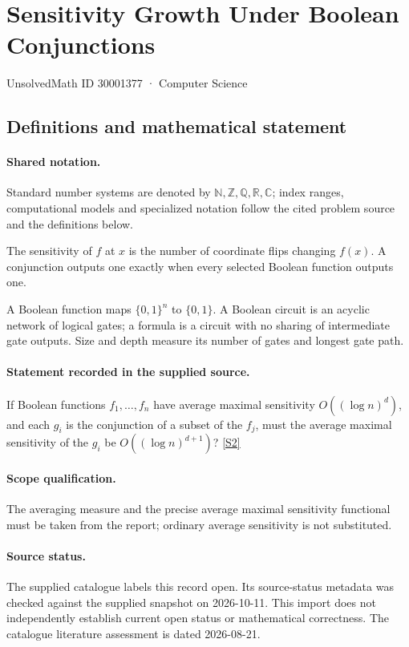 \documentclass[11pt]{article}
\newcommand{\sref}[2]{\hyperlink{source:#1:#2}{[S#2]}}
\begin{document}
\setcounter{section}{30001376}
\section{Sensitivity Growth Under Boolean Conjunctions}\label{30001377}
{\small\sffamily UnsolvedMath ID 30001377 · Computer Science}
\subsection{Definitions and mathematical statement}

\paragraph{Shared notation.}Standard number systems are denoted by $\mathbb N,\mathbb Z,\mathbb Q,\mathbb R,\mathbb C$; index ranges, computational models and specialized notation follow the cited problem source and the definitions below.


The sensitivity of $f$ at $x$ is the number of coordinate flips changing $f(x)$. A conjunction outputs one exactly when every selected Boolean function outputs one.

A Boolean function maps $\{0,1\}^n$ to $\{0,1\}$. A Boolean circuit is an acyclic network of logical gates; a formula is a circuit with no sharing of intermediate gate outputs. Size and depth measure its number of gates and longest gate path.
\paragraph{Statement recorded in the supplied source.}
If Boolean functions $f_1,\ldots,f_n$ have average maximal sensitivity $O((\log n)^d)$, and each $g_i$ is the conjunction of a subset of the $f_j$, must the average maximal sensitivity of the $g_i$ be $O((\log n)^{d+1})$? \sref{30001377}{2}
\paragraph{Scope qualification.}
The averaging measure and the precise average maximal sensitivity functional must be taken from the report; ordinary average sensitivity is not substituted.
\paragraph{Source status.}
The supplied catalogue labels this record open. Its source-status metadata was checked against the supplied snapshot on 2026-10-11. This import does not independently establish current open status or mathematical correctness. The catalogue literature assessment is dated 2026-08-21.
\end{document}
